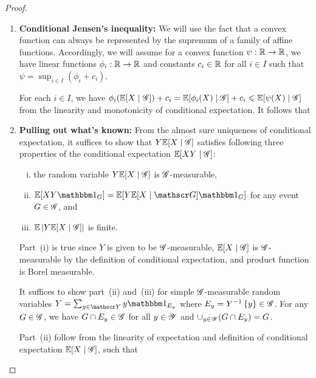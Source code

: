 \documentclass[letterpaper,10pt,english]{article}
\begin{document}
\begin{proof}
\begin{enumerate}
\item \textbf{Conditional Jensen's inequality:}
We will use the fact that a convex function can always be represented by the supremum of a family of affine functions. 
Accordingly, we will assume for a convex function $\psi:\mathbb{R}\to\mathbb{R}$, 
we have linear functions $\phi_i:\mathbb{R}\to\mathbb{R}$ and constants $c_i\in\mathbb{R}$ for all $i \in I$ such that $\psi = \sup_{i\in I}(\phi_i+c_i)$. 

For each $i\in I$, we have $\phi_i(\mathbb{E}[X\mid\mathscr{G}])+c_i = \mathbb{E}[\phi_i(X)\mid\mathscr{G}] +c_i\leqslant \mathbb{E}[\psi(X)\mid\mathscr{G}]$ from the linearity and monotonicity of conditional expectation. 
It follows that



\item \textbf{Pulling out what's known:} 
From the almost sure uniqueness of conditional expectation,  
it suffices to show that $Y\mathbb{E}[X\mid\mathscr{G}]$ satisfies following three properties of the conditional expectation $\mathbb{E}[XY\mid\mathscr{G}]$: 
\begin{enumerate}[(i)]
\item the random variable $Y\mathbb{E}[X\mid\mathscr{G}]$ is $\mathscr{G}$-measurable,
\item $\E[XY\Ind{G}] = \E[Y\E[X\mid\sG]\Ind{G}]$ for any event $G\in\mathscr{G}$, and 
\item $\mathbb{E}\left\lvert Y\mathbb{E}[X\mid\mathscr{G}]\right\rvert$ is finite.
\end{enumerate}
Part~(i) is true since $Y$ is given to be $\mathscr{G}$-measurable, 
$\mathbb{E}[X\mid\mathscr{G}]$ is $\mathscr{G}$-measurable by the definition of conditional expectation, 
and product function is Borel measurable. 

It suffices to show part~(ii) and~(iii) for simple $\mathscr{G}$-measurable random variables $Y=\sum_{y\in\sY}y\Ind{E_y}$ where $E_y = Y^{-1}\left\{y\right\} \in \mathscr{G}$. %
For any $G\in\mathscr{G}$, we have $G\cap E_y\in\mathscr{G}$ for all $y \in \mathscr{Y}$ and $\cup_{y\in\mathscr{Y}}(G\cap E_y) = G$. 

Part~(ii) follow from the linearity of expectation and definition of conditional expectation $\mathbb{E}[X\mid\mathscr{G}]$, 
such that  


\end{enumerate}
\end{proof}
\end{document}

